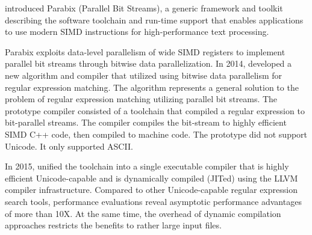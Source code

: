 \citet{parabixorg} introduced Parabix (Parallel Bit Streams), a generic framework and toolkit describing the software toolchain and run-time support that enables applications to use modern SIMD instructions for high-performance text processing.

Parabix exploits data-level parallelism of wide SIMD registers to implement parallel bit streams through bitwise data parallelization. In 2014, \citet{parabixregexnew} developed a new algorithm and compiler that utilized using bitwise data parallelism for regular expression matching. The algorithm represents a general solution to the problem of regular expression matching utilizing parallel bit streams. The prototype compiler consisted of a toolchain that compiled a regular expression to bit-parallel streams. The compiler compiles the bit-stream to highly efficient SIMD C++ code, then compiled to machine code. The prototype did not support Unicode. It only supported ASCII.

In 2015, \citet{parabix} unified the toolchain into a single executable compiler that is highly efficient Unicode-capable and is dynamically compiled (JITed) using the LLVM compiler infrastructure. Compared to other Unicode-capable regular expression search tools, performance evaluations reveal asymptotic performance advantages of more than 10X. At the same time, the overhead of dynamic compilation approaches restricts the benefits to rather large input files.